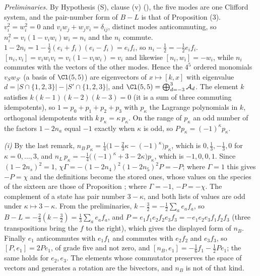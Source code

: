 \emph{Preliminaries.} By Hypothesis (S), clause (v) (), the five modes are one Clifford system, and the pair-number form of $B - L$ is that of Proposition (3). $v_{i}^{2} = w_{i}^{2} = 0$ and $v_{i}w_{j} + w_{j}v_{i} = \delta_{ij}$, distinct modes anticommuting, so $n_{i}^{2} = v_{i}(1 - v_{i}w_{i})w_{i} = n_{i}$ and the $n_{i}$ commute. $1 - 2n_{i} = 1 - \tfrac12(e_{i} + f_{i})(e_{i} - f_{i}) = e_{i}f_{i}$, so $n_{i} - \tfrac12 = -\tfrac12 e_{i}f_{i}$. $[n_{i}, v_{i}] = v_{i}w_{i}v_{i} = v_{i}(1 - v_{i}w_{i}) = v_{i}$ and likewise $[n_{i}, w_{i}] = -w_{i}$, while $n_{i}$ commutes with the vectors of the other modes. Hence the $4^{5}$ ordered monomials $v_{S}w_{S'}$ (a basis of $\Cl(5,5)$) are eigenvectors of $x \mapsto [k, x]$ with eigenvalue $d = |S \cap \{1,2,3\}| - |S' \cap \{1,2,3\}|$, and $\Cl(5,5) = \bigoplus_{d = -3}^{3}\mathcal{A}_{d}$. The element $k$ satisfies $k(k-1)(k-2)(k-3) = 0$ (it is a sum of three commuting idempotents), so $1 = p_{0} + p_{1} + p_{2} + p_{3}$ with $p_{\kappa}$ the Lagrange polynomials in $k$, orthogonal idempotents with $k\,p_{\kappa} = \kappa\,p_{\kappa}$. On the range of $p_{\kappa}$ an odd number of the factors $1 - 2n_{a}$ equal $-1$ exactly when $\kappa$ is odd, so $P\,p_{\kappa} = (-1)^{\kappa}p_{\kappa}$.

\emph{(i)} By the last remark, $n_{B}\,p_{\kappa} = \tfrac14\bigl(1 - \tfrac23\kappa - (-1)^{\kappa}\bigr)p_{\kappa}$, which is $0, \tfrac13, -\tfrac13, 0$ for $\kappa = 0, \dots, 3$, and $n_{L}\,p_{\kappa} = -\tfrac14\bigl((-1)^{\kappa} + 3 - 2\kappa\bigr)p_{\kappa}$, which is $-1, 0, 0, 1$. Since $(1 - 2n_{s})^{2} = 1$, $\chi\Gamma = -(1 - 2n_{4})^{2}(1 - 2n_{5})^{2}P = -P$; where $\Gamma = 1$ this gives $-P = \chi$ and the definitions become the stored ones, whose values on the species of the sixteen are those of Proposition ; where $\Gamma = -1$, $-P = -\chi$. The complement of a state has pair number $3 - \kappa$, and both lists of values are odd under $\kappa \mapsto 3 - \kappa$. From the preliminaries, $k - \tfrac32 = -\tfrac12\sum_{a}e_{a}f_{a}$, so $B - L = -\tfrac23(k - \tfrac32) = \tfrac13\sum_{a}e_{a}f_{a}$, and $P = e_{1}f_{1}e_{2}f_{2}e_{3}f_{3} = -e_{1}e_{2}e_{3}f_{1}f_{2}f_{3}$ (three transpositions bring the $f$ to the right), which gives the displayed form of $n_{B}$. Finally $e_{1}$ anticommutes with $e_{1}f_{1}$ and commutes with $e_{2}f_{2}$ and $e_{3}f_{3}$, so $[P, e_{1}] = 2Pe_{1}$, of grade five and not zero, and $[n_{B}, e_{1}] = -\tfrac16 f_{1} - \tfrac12 Pe_{1}$; the same holds for $e_{2}, e_{3}$. The elements whose commutator preserves the space of vectors and generates a rotation are the bivectors, and $n_{B}$ is not of that kind.

